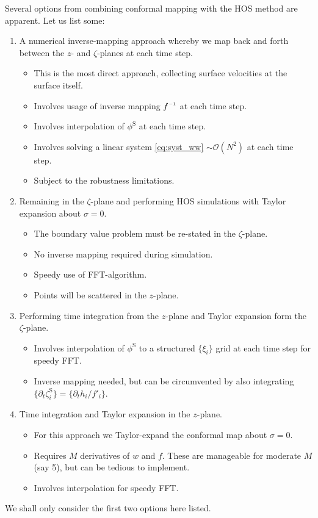 \documentclass[internal]{sintefmemo}
\newcommand{\mr}{\mathrm}
\renewcommand{\S}{^\mr{S}}
\renewcommand{\_}[1]{_\mr{#1}}
\newcommand{\w}{w}
\newcommand{\z}{z}
\newcommand{\zz}{\zeta}
\newcommand{\xx}{\xi}
\newcommand{\yy}{\sigma}
\newcommand{\zmap}{f}
\newcommand{\zzmap}{\zmap^{\raisebox{.2ex}{$\scriptscriptstyle-1$}}}
\renewcommand{\w}{w}
\begin{document}
Several options from combining conformal mapping with the HOS method are apparent.
Let us list some:
\renewcommand\labelitemi{--}
\begin{enumerate}[label={\roman*)}]
	\item A numerical inverse-mapping approach whereby we map back and forth between the $\z$- and $\zz$-planes at each time step. \label{it:direct}
	\begin{itemize}
		\item This  is the most direct approach, collecting surface velocities at the surface itself.
		\item Involves usage of inverse mapping $\zzmap$ at each time step.
		\item Involves interpolation of $\phi\S$ at each time step.
		\item Involves solving a linear system \eqref{eq:syst_ww} $\sim\mathcal O(N^2)$ at each time step.
		\item Subject to the robustness limitations.
	\end{itemize}
	\item Remaining in the $\zz$-plane and performing HOS simulations with Taylor expansion about $\yy=0$. \label{it:chosen}
	\begin{itemize}
		\item The boundary value problem must be re-stated in the $\zz$-plane.
		\item No inverse mapping required during simulation.
		\item Speedy use of FFT-algorithm.
		\item Points will be scattered  in the $\z$-plane. 
	\end{itemize}
	\item Performing time integration from the $\z$-plane and Taylor expansion form the $\zz$-plane.
	\begin{itemize}
		\item Involves interpolation of $\phi\S$ to a structured $\{\xx_i\}$ grid at each time step for speedy FFT.
		\item Inverse mapping needed, but can be circumvented by also integrating $\{ \partial_t\zz\S_i\} = \{  \partial_t h_i /\zmap'_i\}$.
	\end{itemize}
	\item Time integration and Taylor expansion in the $\z$-plane.
	\begin{itemize}
		\item For this approach we Taylor-expand the conformal map about $\yy=0$.
		\item Requires $M$ derivatives of $\w$ and $\zmap$. These are manageable for moderate $M$ (say 5), but can be tedious to implement.
		\item Involves interpolation for speedy FFT.
	\end{itemize}
\end{enumerate}
We shall only consider the first two options here listed.
\end{document}
